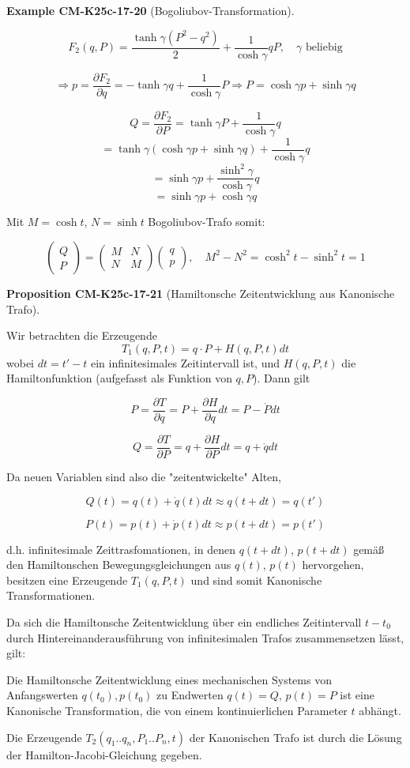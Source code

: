 \documentclass[10pt, letterpaper]{article}
\newcommand{\CustomHeading}[3]{%
  \par\medskip\noindent%
  \textbf{#1 #2} \textnormal{(#3)}.\enskip%
}
\newenvironment{PROP}[2]{\CustomHeading{Proposition}{#1}{#2}}{}
\newenvironment{EXA}[2]{\CustomHeading{Example}{#1}{#2}}{}
\begin{document}
\begin{EXA}{CM-K25c-17-20}{Bogoliubov-Transformation}
\[F_2(q,P) = \frac{\tanh\gamma(P^2-q^2)}{2} + \frac{1}{\cosh\gamma}qP, \quad \gamma \text{ beliebig}\]

\[\Rightarrow p = \frac{\partial F_2}{\partial q} = -\tanh\gamma q + \frac{1}{\cosh\gamma}P \Rightarrow P = \cosh\gamma p + \sinh\gamma q\]

\[Q = \frac{\partial F_2}{\partial P} = \tanh\gamma P + \frac{1}{\cosh\gamma}q\]
\[= \tanh\gamma(\cosh\gamma p + \sinh\gamma q) + \frac{1}{\cosh\gamma}q\]
\[= \sinh\gamma p + \frac{\sinh^2\gamma}{\cosh\gamma}q\]
\[= \sinh\gamma p + \cosh\gamma q\]

Mit $M = \cosh t$, $N = \sinh t$ Bogoliubov-Trafo somit:

\[
\begin{pmatrix} Q \\ P \end{pmatrix} = 
\begin{pmatrix} M & N \\ N & M \end{pmatrix}
\begin{pmatrix} q \\ p \end{pmatrix}, \quad M^2 - N^2 = \cosh^2 t - \sinh^2 t = 1
\]
\end{EXA}

\begin{PROP}{CM-K25c-17-21}{Hamiltonsche Zeitentwicklung aus Kanonische Trafo}
Wir betrachten die Erzeugende 
$$T_1(q,P,t) = q\cdot P + H(q,P,t)dt$$ 
wobei $dt = t'-t$ ein infinitesimales Zeitintervall ist, und $H(q,P,t)$ die Hamiltonfunktion (aufgefasst als Funktion von $q,P$). Dann gilt

\[
P = \frac{\partial T}{\partial q} = P + \frac{\partial H}{\partial q}dt = P - \dot{P}dt
\]

\[
Q = \frac{\partial T}{\partial P} = q + \frac{\partial H}{\partial P}dt = q + \dot{q}dt
\]

Da neuen Variablen sind also die "zeitentwickelte" Alten,

\[
Q(t) = q(t) + \dot{q}(t)dt \approx q(t+dt) = q(t')
\]

\[
P(t) = p(t) + \dot{p}(t)dt \approx p(t+dt) = p(t')
\]

d.h. infinitesimale Zeittrasfomationen, in denen $q(t+dt)$, $p(t+dt)$ gemäß den Hamiltonschen Bewegungsgleichungen aus $q(t)$, $p(t)$ hervorgehen, besitzen eine Erzeugende $T_1(q,P,t)$ und sind somit Kanonische Transformationen.

Da sich die Hamiltonsche Zeitentwicklung über ein endliches Zeitintervall $t-t_0$ durch Hintereinanderausführung von infinitesimalen Trafos zusammensetzen lässt, gilt:

Die Hamiltonsche Zeitentwicklung eines mechanischen Systems von Anfangswerten $q(t_0), p(t_0)$ zu Endwerten $q(t) = Q$, $p(t) = P$ ist eine Kanonische Transformation, die von einem kontinuierlichen Parameter $t$ abhängt.


Die Erzeugende $T_2(q_1..q_n, P_1..P_n,t)$ der Kanonischen Trafo ist durch die Lösung der Hamilton-Jacobi-Gleichung gegeben.
\end{PROP}
\end{document}
